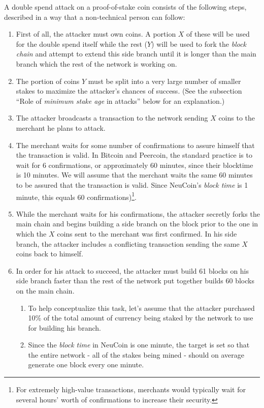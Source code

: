 \documentclass[a4paper,11pt]{article}
\begin{document}
A double spend attack on a proof-of-stake coin consists of the following steps, described in a way that a non-technical person can follow:
\begin{enumerate}
\setlength{\itemsep}{0pt}
\item{First of all, the attacker must own coins. A portion $X$ of these will be used for the double spend itself while the rest ($Y$) will be used to fork the \textit{block chain} and attempt to extend this side branch until it is longer than the main branch which the rest of the network is working on. }
\item{The portion of coins $Y$ must be split into a very large number of smaller stakes to maximize the attacker's chances of success. (See the subsection ``Role of \textit{minimum stake age} in attacks'' below for an explanation.)}
\item{The attacker broadcasts a transaction to the network sending $X$ coins to the merchant he plans to attack.}
\item{The merchant waits for some number of confirmations to assure himself that the transaction is valid. In Bitcoin and Peercoin, the standard practice is to wait for 6 confirmations, or approximately 60 minutes, since their blocktime is 10 minutes. We will assume that the merchant waits the same 60 minutes to be assured that the transaction is valid. Since NeuCoin's \textit{block time} is 1 minute, this equals 60 confirmations)\footnote{ For extremely high-value transactions, merchants would typically wait for several hours' worth of confirmations to increase their security.}.}
\item{While the merchant waits for his confirmations, the attacker secretly forks the main chain and begins building a side branch on the block prior to the one in which the $X$ coins sent to the merchant was first confirmed. In his side branch, the attacker includes a conflicting transaction sending the same $X$ coins back to himself.}
\item{In order for his attack to succeed, the attacker must build 61 blocks on his side branch faster than the rest of the network put together builds 60 blocks on the main chain. 
	\begin{enumerate}
	\setlength{\itemsep}{0pt}
	\item{To help conceptualize this task, let's assume that the attacker purchased 10\% of the total amount of currency being staked by the network to use for building his branch.}
	\item{Since the \textit{block time} in NeuCoin is one minute, the target is set so that the entire network - all of the stakes being mined - should on average generate one block every one minute.}

\end{enumerate}}
\end{enumerate}
\end{document}
